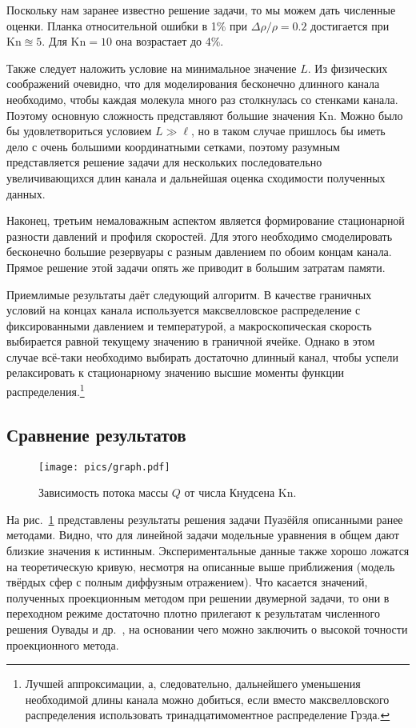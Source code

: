 \documentclass[english,russian,a4paper,12pt]{article}
\newcommand{\Kn}{\mathrm{Kn}}
\begin{document}
Поскольку нам заранее известно решение задачи, то мы можем дать численные оценки.
Планка относительной ошибки в 1\% при \(\Delta\rho/\rho = 0.2\) достигается при \(\Kn \approxeq 5\).
Для \(\Kn=10\) она возрастает до 4\%.

Также следует наложить условие на минимальное значение \(L\). Из физических соображений очевидно, что
для моделирования бесконечно длинного канала необходимо, чтобы каждая молекула много раз столкнулась со
стенками канала. Поэтому основную сложность представляют большие значения \(\Kn\). Можно было бы удовлетвориться
условием \(L \gg \ell\), но в таком случае пришлось бы иметь дело с очень большими координатными сетками,
поэтому разумным представляется решение задачи для нескольких последовательно увеличивающихся длин канала и
дальнейшая оценка сходимости полученных данных.

Наконец, третьим немаловажным аспектом является формирование стационарной разности давлений и профиля скоростей.
Для этого необходимо смоделировать бесконечно большие резервуары с разным давлением по обоим концам канала.
Прямое решение этой задачи опять же приводит в большим затратам памяти.

Приемлимые результаты даёт следующий алгоритм.
В качестве граничных условий на концах канала используется максвелловское распределение с фиксированными давлением и температурой,
а макроскопическая скорость выбирается равной текущему значению в граничной ячейке.
Однако в этом случае всё-таки необходимо выбирать достаточно длинный канал,
чтобы успели релаксировать к стационарному значению высшие моменты функции распределения.\footnote
{
	Лучшей аппроксимации, а, следовательно, дальнейшего уменьшения необходимой длины канала можно добиться,
	если вместо максвелловского распределения использовать тринадцатимоментное распределение Грэда.
}

\subsection{Сравнение результатов}

\begin{figure}[ht]
	\centering
	\texttt{[image: pics/graph.pdf]}
	\caption{Зависимость потока массы \(Q\) от числа Кнудсена \(\Kn\).}\label{fig:graph}
\end{figure}

На рис.~\ref{fig:graph} представлены результаты решения задачи Пуазёйля описанными ранее методами.
Видно, что для линейной задачи модельные уравнения в общем дают близкие значения к истинным.
Экспериментальные данные также хорошо ложатся на теоретическую кривую,
несмотря на описанные выше приближения (модель твёрдых сфер с полным диффузным отражением).
Что касается значений, полученных проекционным методом при решении двумерной задачи,
то они в переходном режиме достаточно плотно прилегают к результатам численного решения Оувады и др.~\cite{Ohwada1989b},
на основании чего можно заключить о высокой точности проекционного метода.
\end{document}
